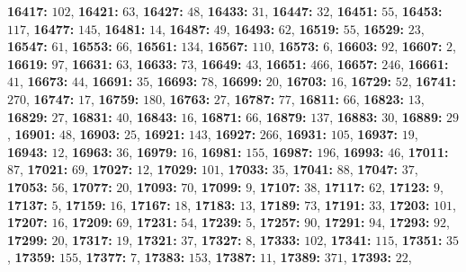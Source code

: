 \textsf{\bfseries 16417:} $102$, \textsf{\bfseries 16421:} $63$, \textsf{\bfseries 16427:} $48$, \textsf{\bfseries 16433:} $31$, \textsf{\bfseries 16447:} $32$, \textsf{\bfseries 16451:} $55$, \textsf{\bfseries 16453:} $117$, \textsf{\bfseries 16477:} $145$, \textsf{\bfseries 16481:} $14$, \textsf{\bfseries 16487:} $49$, \textsf{\bfseries 16493:} $62$, \textsf{\bfseries 16519:} $55$, \textsf{\bfseries 16529:} $23$, \textsf{\bfseries 16547:} $61$, \textsf{\bfseries 16553:} $66$, \textsf{\bfseries 16561:} $134$, \textsf{\bfseries 16567:} $110$, \textsf{\bfseries 16573:} $6$, \textsf{\bfseries 16603:} $92$, \textsf{\bfseries 16607:} $2$, \textsf{\bfseries 16619:} $97$, \textsf{\bfseries 16631:} $63$, \textsf{\bfseries 16633:} $73$, \textsf{\bfseries 16649:} $43$, \textsf{\bfseries 16651:} $466$, \textsf{\bfseries 16657:} $246$, \textsf{\bfseries 16661:} $41$, \textsf{\bfseries 16673:} $44$, \textsf{\bfseries 16691:} $35$, \textsf{\bfseries 16693:} $78$, \textsf{\bfseries 16699:} $20$, \textsf{\bfseries 16703:} $16$, \textsf{\bfseries 16729:} $52$, \textsf{\bfseries 16741:} $270$, \textsf{\bfseries 16747:} $17$, \textsf{\bfseries 16759:} $180$, \textsf{\bfseries 16763:} $27$, \textsf{\bfseries 16787:} $77$, \textsf{\bfseries 16811:} $66$, \textsf{\bfseries 16823:} $13$, \textsf{\bfseries 16829:} $27$, \textsf{\bfseries 16831:} $40$, \textsf{\bfseries 16843:} $16$, \textsf{\bfseries 16871:} $66$, \textsf{\bfseries 16879:} $137$, \textsf{\bfseries 16883:} $30$, \textsf{\bfseries 16889:} $29$, \textsf{\bfseries 16901:} $48$, \textsf{\bfseries 16903:} $25$, \textsf{\bfseries 16921:} $143$, \textsf{\bfseries 16927:} $266$, \textsf{\bfseries 16931:} $105$, \textsf{\bfseries 16937:} $19$, \textsf{\bfseries 16943:} $12$, \textsf{\bfseries 16963:} $36$, \textsf{\bfseries 16979:} $16$, \textsf{\bfseries 16981:} $155$, \textsf{\bfseries 16987:} $196$, \textsf{\bfseries 16993:} $46$, \textsf{\bfseries 17011:} $87$, \textsf{\bfseries 17021:} $69$, \textsf{\bfseries 17027:} $12$, \textsf{\bfseries 17029:} $101$, \textsf{\bfseries 17033:} $35$, \textsf{\bfseries 17041:} $88$, \textsf{\bfseries 17047:} $37$, \textsf{\bfseries 17053:} $56$, \textsf{\bfseries 17077:} $20$, \textsf{\bfseries 17093:} $70$, \textsf{\bfseries 17099:} $9$, \textsf{\bfseries 17107:} $38$, \textsf{\bfseries 17117:} $62$, \textsf{\bfseries 17123:} $9$, \textsf{\bfseries 17137:} $5$, \textsf{\bfseries 17159:} $16$, \textsf{\bfseries 17167:} $18$, \textsf{\bfseries 17183:} $13$, \textsf{\bfseries 17189:} $73$, \textsf{\bfseries 17191:} $33$, \textsf{\bfseries 17203:} $101$, \textsf{\bfseries 17207:} $16$, \textsf{\bfseries 17209:} $69$, \textsf{\bfseries 17231:} $54$, \textsf{\bfseries 17239:} $5$, \textsf{\bfseries 17257:} $90$, \textsf{\bfseries 17291:} $94$, \textsf{\bfseries 17293:} $92$, \textsf{\bfseries 17299:} $20$, \textsf{\bfseries 17317:} $19$, \textsf{\bfseries 17321:} $37$, \textsf{\bfseries 17327:} $8$, \textsf{\bfseries 17333:} $102$, \textsf{\bfseries 17341:} $115$, \textsf{\bfseries 17351:} $35$, \textsf{\bfseries 17359:} $155$, \textsf{\bfseries 17377:} $7$, \textsf{\bfseries 17383:} $153$, \textsf{\bfseries 17387:} $11$, \textsf{\bfseries 17389:} $371$, \textsf{\bfseries 17393:} $22$, 
